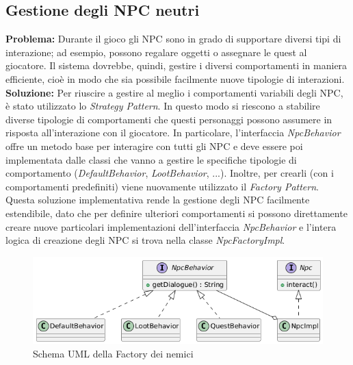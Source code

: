 \documentclass[a4paper,12pt]{report}
\begin{document}
\subsection{\textbf{Gestione degli NPC neutri}}
\textbf{Problema:} Durante il gioco gli NPC sono in grado di supportare diversi tipi di interazione; ad esempio, possono regalare oggetti o assegnare le quest al giocatore.
Il sistema dovrebbe, quindi, gestire i diversi comportamenti in maniera efficiente, cioè in modo che sia possibile facilmente nuove tipologie di interazioni.\newline
\textbf{Soluzione:} Per riuscire a gestire al meglio i comportamenti variabili degli NPC, è stato utilizzato lo \textit{Strategy Pattern}.
In questo modo si riescono a stabilire diverse tipologie di comportamenti che questi personaggi possono assumere in risposta all'interazione con il giocatore.
In particolare, l'interfaccia \textit{NpcBehavior} offre un metodo base per interagire con tutti gli NPC e deve essere poi implementata dalle classi che vanno a gestire 
le specifiche tipologie di comportamento (\textit{DefaultBehavior}, \textit{LootBehavior}, ...). 
Inoltre, per crearli (con i comportamenti predefiniti) viene nuovamente utilizzato il \textit{Factory Pattern}. 
Questa soluzione implementativa rende la gestione degli NPC facilmente estendibile, dato che per definire ulteriori comportamenti si possono direttamente 
creare nuove particolari implementazioni dell'interfaccia \textit{NpcBehavior} e l'intera logica di creazione degli NPC si trova nella classe \textit{NpcFactoryImpl}.\newline

\begin{figure}[H]
	\centering{}
	\includegraphics[width=\textwidth]{img/NpcUML.png}
	\caption{Schema UML della Factory dei nemici}
\end{figure}
\end{document}
